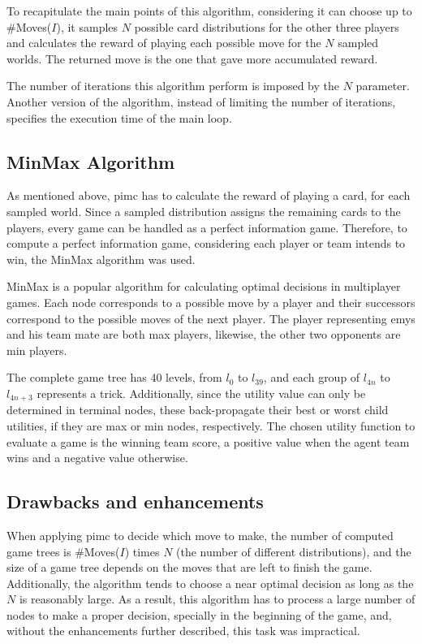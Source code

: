 To recapitulate the main points of this algorithm, considering it can choose up to \#Moves($I$), it samples $N$ possible card distributions for the other three players and calculates the reward of playing each possible move for the $N$ sampled worlds.
The returned move is the one that gave more accumulated reward.

The number of iterations this algorithm perform is imposed by the $N$ parameter.
Another version of the algorithm, instead of limiting the number of iterations, specifies the execution time of the main loop.

\subsection*{MinMax Algorithm}

As mentioned above, \ac{pimc} has to calculate the reward of playing a card, for each sampled world.
Since a sampled distribution assigns the remaining cards to the players, every game can be handled as a perfect information game.
Therefore, to compute a perfect information game, considering each player or team intends to win, the MinMax algorithm was used.

MinMax is a popular algorithm for calculating optimal decisions in multiplayer games.
Each node corresponds to a possible move by a player and their successors correspond to the possible moves of the next player.
The player representing \ac{emys} and his team mate are both max players, likewise, the other two opponents are min players.

The complete game tree has 40 levels, from $l_{0}$ to $l_{39}$, and each group of $l_{4n}$ to $l_{4n+3}$ represents a trick.
Additionally, since the utility value can only be determined in terminal nodes, these back-propagate their best or worst child utilities, if they are max or min nodes, respectively.
The chosen utility function to evaluate a game is the winning team score, a positive value when the agent team wins and a negative value otherwise.



\subsection{Drawbacks and enhancements}

When applying \ac{pimc} to decide which move to make, the number of computed game trees is \#Moves($I$) times $N$ (the number of different distributions), and the size of a game tree depends on the moves that are left to finish the game.
Additionally, the algorithm tends to choose a near optimal decision as long as the $N$ is reasonably large.
As a result, this algorithm has to process a large number of nodes to make a proper decision, specially in the beginning of the game, and, without the enhancements further described, this task was impractical.

